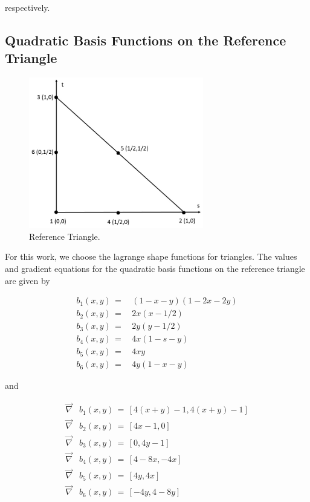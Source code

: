 \documentclass[11pt]{article}
\begin{document}
\noindent respectively.

\subsection{Quadratic Basis Functions on the Reference Triangle}
\label{sec::triref_quadratic}


\begin{figure}[hbt]
\centering
	\includegraphics[width=3.0in]{./Figures/ref_triangle.jpg}
	\caption{Reference Triangle.}
\hspace{0.5cm}
\label{fig::ref_triangle}
\end{figure}

For this work, we choose the lagrange shape functions for triangles. The values and gradient equations for the quadratic basis functions on the reference triangle are given by

\begin{equation}
\label{eq::reftri_quad_basis_vals}
\begin{aligned}
b_1(x,y) \, =& \, (1-x-y) (1-2x-2y) \\
b_2(x,y) \, =& \, 2x(x-1/2) \\
b_3(x,y) \, =& \, 2y(y-1/2) \\
b_4(x,y) \, =& \, 4x (1-s-y) \\
b_5(x,y) \, =& \, 4xy\\
b_6(x,y) \, =& \, 4y (1-x-y)
\end{aligned}
\end{equation}

\noindent and

\begin{equation}
\label{eq::reftri_quad_basis_grads}
\begin{aligned}
\vec{\nabla}& b_1(x,y) \, = \, \left[ 4(x+y)-1 , 4(x+y)-1   \right] \\
\vec{\nabla}& b_2(x,y) \, = \, \left[ 4x-1, 0   \right] \\
\vec{\nabla}& b_3(x,y) \, = \, \left[ 0, 4y-1   \right] \\
\vec{\nabla}& b_4(x,y) \, = \, \left[ 4-8x, -4x   \right] \\
\vec{\nabla}& b_5(x,y) \, = \, \left[ 4y, 4x   \right] \\
\vec{\nabla}& b_6(x,y) \, = \, \left[ -4y, 4-8y   \right] 
\end{aligned}
\end{equation}
\end{document}
